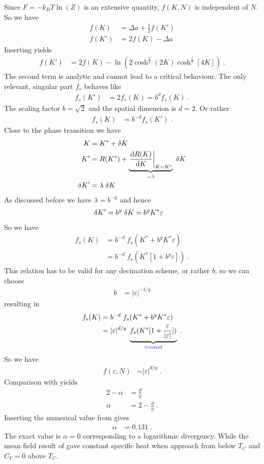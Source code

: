 % 
Since $F=-k_{B} T \ln(Z)$  is an extensive quantity, $f(K,N)$ is independent 
of $N$. So we have
%
\begin{align*}
f(K) &= \Delta a + \frac{1}{2} f(K')\\
f(K') &= 2 f(K) -\Delta a
\end{align*}
%
Inserting  yields
\begin{align}\label{a}
f(K') &= 2 f(K) -   \ln(2 \cosh^{\frac{1}{2}}(2K)\cosh^{\frac{1}{8}}[4 K]) \;.
\end{align}
The second term is analytic and cannot lead to a critical behaviour. The only relevant, singular part $f_{s}$ behaves like
%
\begin{align*}
f_{s}(K') &= 2 f_{s}(K) = b^{d} f_{s}(K)\;.
\end{align*}
%
The scaling factor $b=\sqrt{2}$ and the spatial dimension is $d=2$. Or rather
%
\begin{align*}
f_{s}(K) &= b^{-d} f_{s}(K')\;.
\end{align*}
%
Close to the phase transition we have 
%
\begin{align*}
K &= K^{*} +\var K\\
K' &=  R(K^{*}) +\underbrace{
 \eval{\dv{R(K)}{K}}_{K=K^{*}}
}_{\color{blue} = \lambda}\;\var K\\
\var K' &= \lambda \;\var K
\end{align*}
%
As discussed before we have $\lambda=b^{-y}$ and hence
%
\begin{align*}
\var K' &= b^{y} \;\var K = b^{y} K^{*} \varepsilon
\end{align*}
%
So we have
%
\begin{align*}
f_{s}(K) &= b^{-d}\;f_{s}(K^{*} + b^{y} K^{*} \varepsilon)\\
 &= b^{-d}\;f_{s}(K^{*}[1 + b^{y}  \varepsilon])\;.
\end{align*}
%
This relation has to be valid for any decimation scheme, or rather $b$; so we can choose
%
\begin{align*}
b &= |\varepsilon|^{-1/y}
\end{align*}
%
resulting in 
%
\begin{align*}
f_{s}(K) &= b^{-d}\;f_{s}(K^{*} + b^{y} K^{*} \varepsilon)\\
 &= |\varepsilon|^{d/y}\;\underbrace{
f_{s}(K^{*}[1 +  \frac{\varepsilon}{|\varepsilon|}])
}_{\color{blue} = const}\;.
\end{align*}
%
So we have
%
\begin{align*}
f(\varepsilon,N)&\sim  |\varepsilon|^{d/y}\;.
\end{align*}
%
Comparison with  yields
%
\begin{align*}
2 - \alpha &= \frac{d}{y}\\
\alpha &= 2 - \frac{d}{y}\;.
\end{align*}
%
Inserting the numerical value from  gives
%
\begin{align*}
\alpha &= 0.131\;.
\end{align*}
%
The exact value is $\alpha=0$ corresponding  to a logarithmic divergency.
While the mean field result of  gave constant specific heat 
when approach from below $T_{C}$ and $C_{V}=0$ above $T_{C}$.





